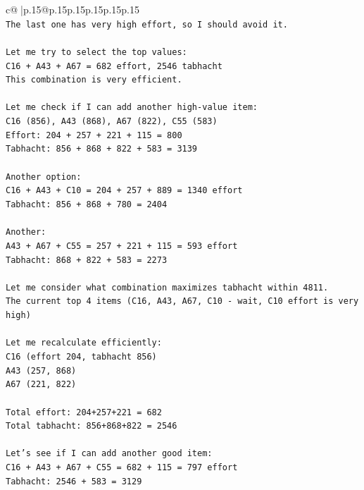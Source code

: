 \documentclass{article}
\begin{document}
{\begin{supertabular}{c@{$\;$}|p{.15\linewidth}@{}p{.15\linewidth}p{.15\linewidth}p{.15\linewidth}p{.15\linewidth}p{.15\linewidth}}
{{{\\ 
\texttt{The last one has very high effort, so I should avoid it.} \\
\\ 
\texttt{Let me try to select the top values:} \\
\texttt{C16 + A43 + A67 = 682 effort, 2546 tabhacht} \\
\texttt{This combination is very efficient.} \\
\\ 
\texttt{Let me check if I can add another high{-}value item:} \\
\texttt{C16 (856), A43 (868), A67 (822), C55 (583)} \\
\texttt{Effort: 204 + 257 + 221 + 115 = 800} \\
\texttt{Tabhacht: 856 + 868 + 822 + 583 = 3139} \\
\\ 
\texttt{Another option:} \\
\texttt{C16 + A43 + C10 = 204 + 257 + 889 = 1340 effort} \\
\texttt{Tabhacht: 856 + 868 + 780 = 2404} \\
\\ 
\texttt{Another:} \\
\texttt{A43 + A67 + C55 = 257 + 221 + 115 = 593 effort} \\
\texttt{Tabhacht: 868 + 822 + 583 = 2273} \\
\\ 
\texttt{Let me consider what combination maximizes tabhacht within 4811.} \\
\texttt{The current top 4 items (C16, A43, A67, C10 {-} wait, C10 effort is very high)} \\
\\ 
\texttt{Let me recalculate efficiently:} \\
\texttt{C16 (effort 204, tabhacht 856)} \\
\texttt{A43 (257, 868)} \\
\texttt{A67 (221, 822)} \\
\\ 
\texttt{Total effort: 204+257+221 = 682} \\
\texttt{Total tabhacht: 856+868+822 = 2546} \\
\\ 
\texttt{Let's see if I can add another good item:} \\
\texttt{C16 + A43 + A67 + C55 = 682 + 115 = 797 effort} \\
\texttt{Tabhacht: 2546 + 583 = 3129} \\
}}}
\end{supertabular}}
\end{document}
